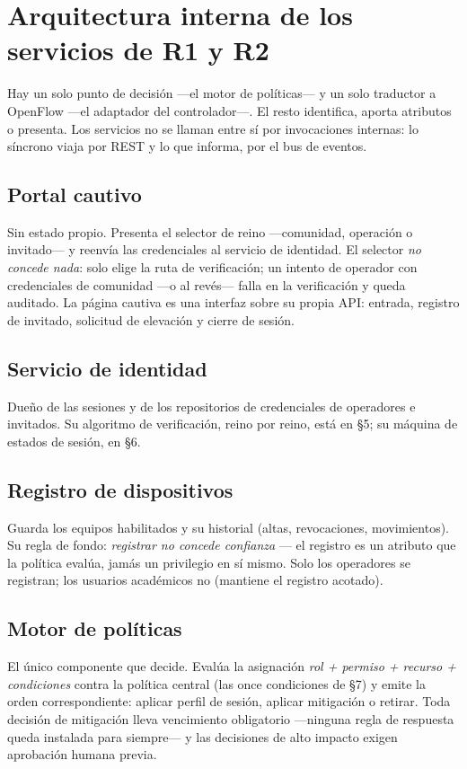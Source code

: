 \documentclass[11pt,a4paper]{article}
\begin{document}
\section{Arquitectura interna de los servicios de R1 y R2}

Hay un solo punto de decisión ---el motor de políticas--- y un solo traductor a OpenFlow ---el adaptador del controlador---. El resto identifica, aporta atributos o presenta. Los servicios no se llaman entre sí por invocaciones internas: lo síncrono viaja por REST y lo que informa, por el bus de eventos.

\subsection{Portal cautivo}
Sin estado propio. Presenta el selector de reino ---comunidad, operación o invitado--- y reenvía las credenciales al servicio de identidad. El selector \emph{no concede nada}: solo elige la ruta de verificación; un intento de operador con credenciales de comunidad ---o al revés--- falla en la verificación y queda auditado. La página cautiva es una interfaz sobre su propia API: entrada, registro de invitado, solicitud de elevación y cierre de sesión.

\subsection{Servicio de identidad}
Dueño de las sesiones y de los repositorios de credenciales de operadores e invitados. Su algoritmo de verificación, reino por reino, está en §5; su máquina de estados de sesión, en §6.

\subsection{Registro de dispositivos}
Guarda los equipos habilitados y su historial (altas, revocaciones, movimientos). Su regla de fondo: \emph{registrar no concede confianza} --- el registro es un atributo que la política evalúa, jamás un privilegio en sí mismo. Solo los operadores se registran; los usuarios académicos no (mantiene el registro acotado).

\subsection{Motor de políticas}
El único componente que decide. Evalúa la asignación \emph{rol + permiso + recurso + condiciones} contra la política central (las once condiciones de §7) y emite la orden correspondiente: aplicar perfil de sesión, aplicar mitigación o retirar. Toda decisión de mitigación lleva vencimiento obligatorio ---ninguna regla de respuesta queda instalada para siempre--- y las decisiones de alto impacto exigen aprobación humana previa.
\end{document}

